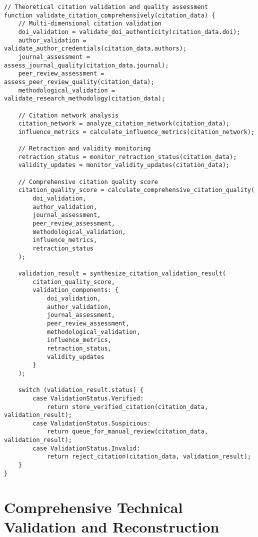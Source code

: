 \documentclass[12pt,a4paper,twoside]{article}
\begin{document}
\begin{lstlisting}[caption=Comprehensive Citation Validation System]
// Theoretical citation validation and quality assessment
function validate_citation_comprehensively(citation_data) {
    // Multi-dimensional citation validation
    doi_validation = validate_doi_authenticity(citation_data.doi);
    author_validation = validate_author_credentials(citation_data.authors);
    journal_assessment = assess_journal_quality(citation_data.journal);
    peer_review_assessment = assess_peer_review_quality(citation_data);
    methodological_validation = validate_research_methodology(citation_data);

    // Citation network analysis
    citation_network = analyze_citation_network(citation_data);
    influence_metrics = calculate_influence_metrics(citation_network);

    // Retraction and validity monitoring
    retraction_status = monitor_retraction_status(citation_data);
    validity_updates = monitor_validity_updates(citation_data);

    // Comprehensive citation quality score
    citation_quality_score = calculate_comprehensive_citation_quality(
        doi_validation,
        author_validation,
        journal_assessment,
        peer_review_assessment,
        methodological_validation,
        influence_metrics,
        retraction_status
    );

    validation_result = synthesize_citation_validation_result(
        citation_quality_score,
        validation_components: {
            doi_validation,
            author_validation,
            journal_assessment,
            peer_review_assessment,
            methodological_validation,
            influence_metrics,
            retraction_status,
            validity_updates
        }
    );

    switch (validation_result.status) {
        case ValidationStatus.Verified:
            return store_verified_citation(citation_data, validation_result);
        case ValidationStatus.Suspicious:
            return queue_for_manual_review(citation_data, validation_result);
        case ValidationStatus.Invalid:
            return reject_citation(citation_data, validation_result);
    }
}
\end{lstlisting}

\section{Comprehensive Technical Validation and Reconstruction}
\end{document}
